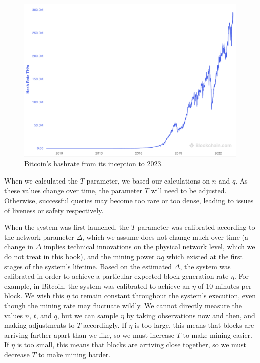 \begin{figure}[h]
  \centering
  \includegraphics[width=\columnwidth,keepaspectratio]{figures/bitcoin-hashrate.png}
  \caption{Bitcoin's hashrate from its inception to 2023.}
  \label{fig.bitcoin-hashrate}
\end{figure}

When we calculated the $T$ parameter, we based our calculations on $n$ and $q$.
As these values change over time, the parameter $T$ will need to be adjusted.
Otherwise, successful queries may become too rare or too dense, leading
to issues of liveness or safety respectively.

When the system was first launched, the $T$ parameter was calibrated
according to the network parameter $\Delta$, which we assume does not
change much over time (a change in $\Delta$ implies technical innovations
on the physical network level, which we do not treat in this book),
and the mining power $nq$ which existed at the first stages of the
system's lifetime. Based on the estimated $\Delta$, the system
was calibrated in order to achieve a particular expected block
generation rate $\eta$. For example, in Bitcoin, the system was
calibrated to achieve an $\eta$ of 10 minutes per block.
We wish this $\eta$ to remain constant throughout the system's
execution, even though the mining rate may fluctuate wildly.
We cannot directly measure the values $n$, $t$, and $q$,
but we can sample $\eta$ by taking observations now and
then, and making adjustments to $T$ accordingly. If $\eta$
is too large, this means that blocks are arriving farther
apart than we like, so we must increase $T$ to make mining
easier. If $\eta$ is too small, this means that blocks
are arriving close together, so we must decrease $T$ to make
mining harder.

